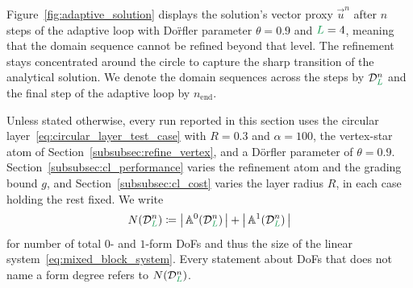 \documentclass[a4paper, 12pt]{article}
\makeatletter
\newcommand{\laststep}{{n_{\mathrm{end}}}}                      %
\newcommand{\totalDoFs}[1]{N\!\left(#1\right)}
\newcommand{\green}{\color{ForestGreen}}
\renewcommand{\L}{{\green L}}
\newcommand{\activeDoFs}{\mathbb{A}}
\newcommand{\activeDoFSet}[2]{\activeDoFs^{#1}_{#2}}
\newcommand{\vvert}[1]{\left\vert #1 \right\vert}
\theoremstyle{definition}
\theoremstyle{plain}
\numberwithin{equation}{section}
\DeclareRobustCommand{\domseq}[1][]{\mathcal{D}\ifx\@empty#1\@empty\else_{#1}\fi}
\makeatother
\begin{document}
\smallskip

Figure~\ref{fig:adaptive_solution} displays the solution's vector proxy $\Vec{u}^n$ after $n$ steps of the adaptive loop with Do\"rfler parameter $\theta = 0.9$ and $\L=4$, meaning that the domain sequence cannot be refined beyond that level. The refinement stays concentrated around the circle to capture the sharp transition of the analytical solution. We denote the domain sequences across the steps by $\domseq[\L]^n$ and the final step of the adaptive loop by $\laststep$.

Unless stated otherwise, every run reported in this section uses the circular layer~\eqref{eq:circular_layer_test_case} with $R = 0.3$ and $\alpha = 100$, the vertex-star atom of Section~\ref{subsubsec:refine_vertex}, and a D\"orfler parameter of $\theta = 0.9$. Section~\ref{subsubsec:cl_performance} varies the refinement atom and the grading bound $g$, and Section~\ref{subsubsec:cl_cost} varies the layer radius $R$, in each case holding the rest fixed. We write
\begin{equation}
    \label{def:total_dofs}
    \totalDoFs{\domseq[\L]^n} \coloneq \vvert{\, \activeDoFSet{0}{}(\domseq[\L]^n) \,} + \vvert{\, \activeDoFSet{1}{}(\domseq[\L]^n) \,}
\end{equation}
for number of total $0$- and $1$-form DoFs and thus the size of the linear system~\eqref{eq:mixed_block_system}. Every statement about DoFs that does not name a form degree refers to $\totalDoFs{\domseq[\L]^n}$.
\end{document}
